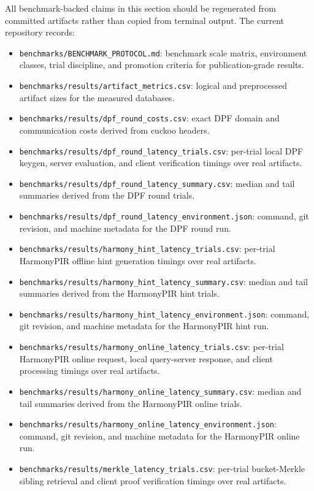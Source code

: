 All benchmark-backed claims in this section should be regenerated from committed artifacts rather than copied from terminal output. The current repository records:
\begin{itemize}[nolistsep,leftmargin=*]
    \item \texttt{benchmarks/BENCHMARK\_PROTOCOL.md}: benchmark scale matrix, environment classes, trial discipline, and promotion criteria for publication-grade results.
    \item \texttt{benchmarks/results/artifact\_metrics.csv}: logical and preprocessed artifact sizes for the measured databases.
    \item \texttt{benchmarks/results/dpf\_round\_costs.csv}: exact DPF domain and communication costs derived from cuckoo headers.
    \item \texttt{benchmarks/results/dpf\_round\_latency\_trials.csv}: per-trial local DPF keygen, server evaluation, and client verification timings over real artifacts.
    \item \texttt{benchmarks/results/dpf\_round\_latency\_summary.csv}: median and tail summaries derived from the DPF round trials.
    \item \texttt{benchmarks/results/dpf\_round\_latency\_environment.json}: command, git revision, and machine metadata for the DPF round run.
    \item \texttt{benchmarks/results/harmony\_hint\_latency\_trials.csv}: per-trial HarmonyPIR offline hint generation timings over real artifacts.
    \item \texttt{benchmarks/results/harmony\_hint\_latency\_summary.csv}: median and tail summaries derived from the HarmonyPIR hint trials.
    \item \texttt{benchmarks/results/harmony\_hint\_latency\_environment.json}: command, git revision, and machine metadata for the HarmonyPIR hint run.
    \item \texttt{benchmarks/results/harmony\_online\_latency\_trials.csv}: per-trial HarmonyPIR online request, local query-server response, and client processing timings over real artifacts.
    \item \texttt{benchmarks/results/harmony\_online\_latency\_summary.csv}: median and tail summaries derived from the HarmonyPIR online trials.
    \item \texttt{benchmarks/results/harmony\_online\_latency\_environment.json}: command, git revision, and machine metadata for the HarmonyPIR online run.
    \item \texttt{benchmarks/results/merkle\_latency\_trials.csv}: per-trial bucket-Merkle sibling retrieval and client proof verification timings over real artifacts.

\end{itemize}

